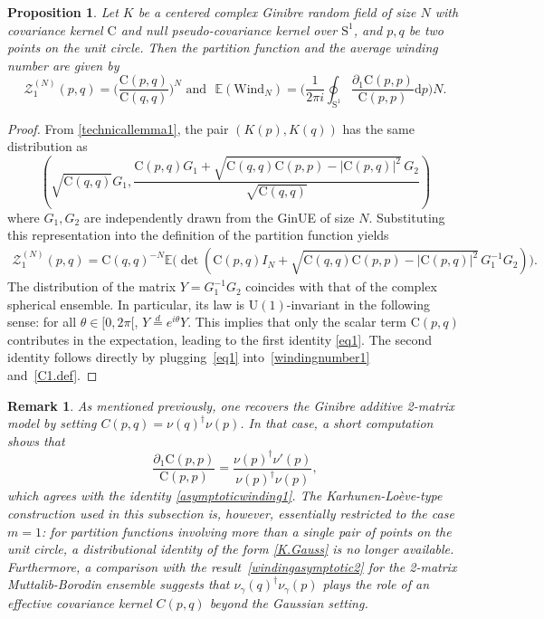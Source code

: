 \documentclass[pdflatex,sn-mathphys-num]{sn-jnl}
\theoremstyle{thmstyleone}
\newtheorem{proposition}[theorem]{Proposition}
\newtheorem{remark}[theorem]{Remark}
\numberwithin{equation}{section}
\newcommand{\Sp}{\mathrm{S}^{1}}
\newcommand{\Cc}{\mathrm{C}}
\begin{document}
 
\begin{proposition}\label{proposition.gin}
Let $K$ be a centered complex Ginibre random field of size $N$ with covariance kernel $\Cc$ and null pseudo-covariance kernel over $\Sp$, and $p,q$ be two points on the unit circle. Then the partition function and the average winding number are given by
\begin{equation}
    \mathscr{Z}^{\left(N\right)}_{1}\left(p,q\right)=\Bigg(\frac{\Cc\left( p,q \right)}{\Cc\left( q,q \right)}\Bigg)^{N}\text{ and }\,\,\mathbb{E}\left( \mathrm{Wind}_{N} \right)=\Bigg(\frac{1}{2\pi i}\oint_{\Sp}^{}\frac{\partial_{1}\Cc\left( p,p \right)}{\Cc\left( p,p \right)}\mathrm{d}p\Bigg)N \label{eq1}.
\end{equation}
\end{proposition}
\begin{proof}
From \autoref{technicallemma1}, the pair $(K(p),K(q))$ has the same distribution as
\begin{equation*}
    \left(\sqrt{\Cc(q,q)} G_1,\frac{\Cc(p,q)G_1+\sqrt{\Cc(q,q)\Cc(p,p)-|\Cc(p,q)|^2}\,G_2}{\sqrt{\Cc(q,q)}}\right)
\end{equation*}
where $G_{1},G_{2}$ are independently drawn from the GinUE of size $N$. Substituting this representation into the definition of the partition function yields
\begin{align*}
        \mathscr{Z}_1^{\left(N\right)}\left(p,q\right)=\Cc(q,q)^{-N}\mathbb{E}\Big(\det(\Cc(p,q)I_N+\sqrt{\Cc(q,q)\Cc(p,p)-|\Cc(p,q)|^2}\,G_1^{-1}G_2)\Big).
\end{align*}
The distribution of the matrix $Y=G_{1}^{-1}G_{2}$ coincides with that of the complex spherical ensemble. In particular, its law is $\mathrm{U}(1)$-invariant in the following sense: for all $\theta\in[0,2\pi[$, $Y\overset{d}{=}e^{i\theta}Y$. This implies that only the scalar term $\Cc(p,q)$ contributes in the expectation, leading to the first identity \eqref{eq1}. The second identity follows directly by plugging~\eqref{eq1} into~\eqref{windingnumber1} and~\eqref{C1.def}. 
\end{proof}

\begin{remark}
    As mentioned previously, one recovers the Ginibre additive 2-matrix model by setting $C(p,q)=\nu(q)^{\dagger}\nu(p)$. In that case, a short computation shows that
    \begin{equation}
        \frac{\partial_{1}\Cc\left( p,p \right)}{\Cc\left( p,p \right)}=\frac{\nu(p)^{\dagger}\nu'(p)}{\nu(p)^{\dagger}\nu(p)},
    \end{equation}
    which agrees with the identity \eqref{asymptoticwinding1}. The Karhunen-Lo\`eve-type construction used in this subsection is, however, essentially restricted to the case $m=1$: for partition functions involving more than a single pair of points on the unit circle, a distributional identity of the form \eqref{K.Gauss} is no longer available. Furthermore, a comparison with the result~\eqref{windingasymptotic2} for the 2-matrix Muttalib-Borodin ensemble suggests that $\nu_{\gamma}\left( q \right)^{\dagger}\nu_{\gamma}\left( p \right)$ plays the role of an effective covariance kernel $C(p,q)$ beyond the Gaussian setting.
\end{remark}
\end{document}
